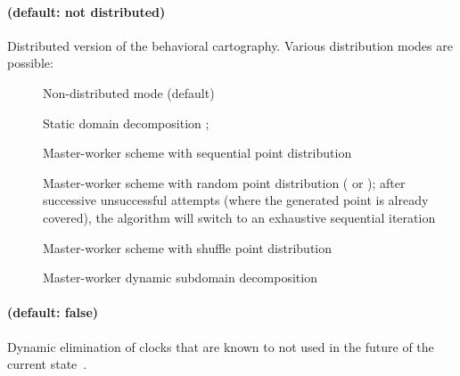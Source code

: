 \paragraph{ (default: not distributed)}
Distributed version of the behavioral cartography.
Various distribution modes are possible:

\begin{description}
	\item[] Non-distributed mode (default)
	\item[] Static domain decomposition \cite{ACN15}; %
	\item[] Master-worker scheme with sequential point distribution \cite{ACE14}
	\item[] Master-worker scheme with random point distribution (\eg{}  or ); after  successive unsuccessful attempts (where the generated point is already covered), the algorithm will switch to an exhaustive sequential iteration \cite{ACE14}
	\item[] Master-worker scheme with shuffle point distribution \cite{ACN15}
	\item[] Master-worker dynamic subdomain decomposition \cite{ACN15}
\end{description}




\paragraph{ (default: false)}
Dynamic elimination of clocks that are known to not used in the future of the current state~\cite{Andre13FSFMA}.




% 



